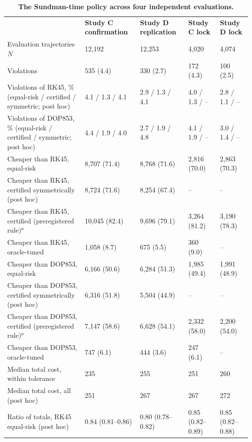 \documentclass[10pt,letterpaper]{article}
\newlength\savedwidth
\newcommand\thickhline{\noalign{\global\savedwidth\arrayrulewidth\global\arrayrulewidth 2pt}%
\hline
\noalign{\global\arrayrulewidth\savedwidth}}
\begin{document}
\begin{table}[!htbp]
\centering
\caption{{\bf The Sundman-time policy across four independent evaluations.}}
\footnotesize
\begin{tabular}{|L{1.55in}|L{0.95in}|L{0.95in}|L{0.8in}|L{0.8in}|}
\hline
 & \textbf{Study C confirmation} & \textbf{Study D replication} & \textbf{Study C lock} & \textbf{Study D lock} \\ \thickhline
Evaluation trajectories $N$ & 12,192 & 12,253 & 4,020 & 4,074 \\ \hline
Violations & 535 (4.4) & 330 (2.7) & 172 (4.3) & 100 (2.5) \\ \hline
Violations of RK45, \% (equal-risk / certified / symmetric; post hoc) & 4.1 / 1.3 / 4.1 & 2.9 / 1.3 / 4.1 & 4.0 / 1.3 / -- & 2.8 / 1.1 / -- \\ \hline
Violations of DOP853, \% (equal-risk / certified / symmetric; post hoc) & 4.4 / 1.9 / 4.0 & 2.7 / 1.9 / 4.8 & 4.1 / 1.9 / -- & 3.0 / 1.4 / -- \\ \thickhline
Cheaper than RK45, equal-risk & 8,707 (71.4) & 8,768 (71.6) & 2,816 (70.0) & 2,863 (70.3) \\ \hline
Cheaper than RK45, certified symmetrically (post hoc) & 8,724 (71.6) & 8,254 (67.4) & -- & -- \\ \hline
Cheaper than RK45, certified (preregistered rule)$^{a}$ & 10,045 (82.4) & 9,696 (79.1) & 3,264 (81.2) & 3,190 (78.3) \\ \hline
Cheaper than RK45, oracle-tuned & 1,058 (8.7) & 675 (5.5) & 360 (9.0) & -- \\ \hline
Cheaper than DOP853, equal-risk & 6,166 (50.6) & 6,284 (51.3) & 1,985 (49.4) & 1,991 (48.9) \\ \hline
Cheaper than DOP853, certified symmetrically (post hoc) & 6,316 (51.8) & 5,504 (44.9) & -- & -- \\ \hline
Cheaper than DOP853, certified (preregistered rule)$^{a}$ & 7,147 (58.6) & 6,628 (54.1) & 2,332 (58.0) & 2,200 (54.0) \\ \hline
Cheaper than DOP853, oracle-tuned & 747 (6.1) & 444 (3.6) & 247 (6.1) & -- \\ \thickhline
Median total cost, within tolerance & 235 & 255 & 251 & 260 \\ \hline
Median total cost, all (post hoc) & 251 & 267 & 267 & 272 \\ \thickhline
Ratio of totals, RK45 equal-risk (post hoc) & 0.84 (0.81--0.86) & 0.80 (0.78--0.82) & 0.85 (0.82--0.89) & 0.85 (0.82--0.88) \\ \hline

\end{tabular}
\end{table}
\end{document}
